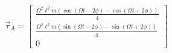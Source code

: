 \documentclass[11pt, spanish, a4paper, twoside]{article}
\begin{document}
\begin{enumerate}
\[			\qquad
				\vec{\tau}_A = \left[\begin{matrix}\frac{\Omega^{2} \ell^{2} m \left(\cos{\left(\Omega t - 2 \phi \right)} - \cos{\left(\Omega t + 2 \phi \right)}\right)}{4}\\\frac{\Omega^{2} \ell^{2} m \left(\sin{\left(\Omega t - 2 \phi \right)} - \sin{\left(\Omega t + 2 \phi \right)}\right)}{4}\\0\end{matrix}\right]
			\]


	\end{enumerate}
\end{document}
